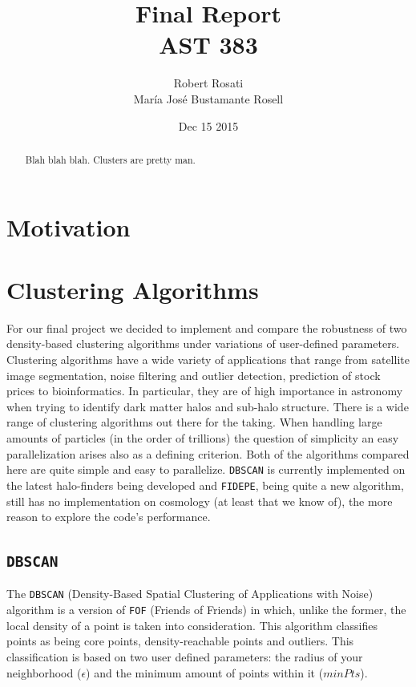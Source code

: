 \documentclass[12pt]{article}
\begin{document}
\singlespacing
\title{Final Report\\
AST 383}
\date{Dec 15 2015}
\author{Robert Rosati \\ Mar\'{i}a Jos\'{e} Bustamante Rosell}
\maketitle

\begin{abstract}
\par Blah blah blah. Clusters are pretty man.
\end{abstract}

\doublespacing
\section{Motivation}

\section{Clustering Algorithms}
\par For our final project we decided to implement and compare the robustness of two density-based clustering algorithms under variations of user-defined parameters. 
Clustering algorithms have a wide variety of applications that range from satellite image segmentation, noise filtering and outlier detection, prediction of stock prices to bioinformatics. In particular, they are of high importance in astronomy when trying to identify dark matter halos and sub-halo structure.
There is a wide range of clustering algorithms out there for the taking. When handling large amounts of particles (in the order of trillions) the question of simplicity an easy parallelization arises also as a defining criterion. Both of the algorithms compared here are quite simple and easy to parallelize. \texttt{DBSCAN} is currently implemented on the latest halo-finders being developed \cite{BDCATS} and \texttt{FIDEPE}, being quite a new algorithm, still has no implementation on cosmology (at least that we know of), the more reason to explore the code's performance.


\subsection{\texttt{DBSCAN}}

The \texttt{DBSCAN} (Density-Based Spatial Clustering of Applications with Noise) algorithm is a version of \texttt{FOF} (Friends of Friends) in which, unlike the former, the local density of a point is taken into consideration. This algorithm classifies points as being core points, density-reachable points and outliers. This classification is based on two user defined parameters: the radius of your neighborhood ($\epsilon $) and the minimum amount of points within it ($minPts$). \cite{DBSCAN}
\end{document}
